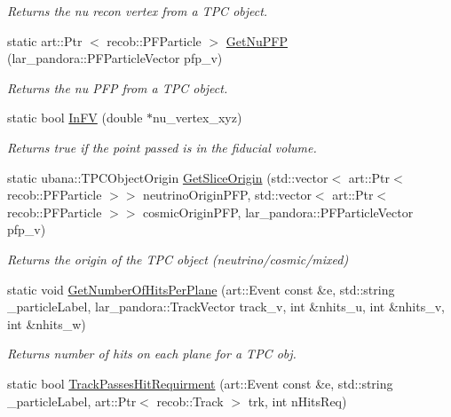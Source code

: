 \begin{DoxyCompactItemize}
\begin{DoxyCompactList}\small\item\em \-Returns the nu recon vertex from a \-T\-P\-C object. \end{DoxyCompactList}\item 
static art\-::\-Ptr\*
$<$ recob\-::\-P\-F\-Particle $>$ \hyperlink{classUBXSecHelper_a1803584104e1b6f618fe86b28aec1927}{\-Get\-Nu\-P\-F\-P} (lar\-\_\-pandora\-::\-P\-F\-Particle\-Vector pfp\-\_\-v)
\begin{DoxyCompactList}\small\item\em \-Returns the nu \-P\-F\-P from a \-T\-P\-C object. \end{DoxyCompactList}\item 
static bool \hyperlink{classUBXSecHelper_a4ff7e0d6774d5628cc2a3d19bb2d3492}{\-In\-F\-V} (double $\ast$nu\-\_\-vertex\-\_\-xyz)
\begin{DoxyCompactList}\small\item\em \-Returns true if the point passed is in the fiducial volume. \end{DoxyCompactList}\item 
static ubana\-::\-T\-P\-C\-Object\-Origin \hyperlink{classUBXSecHelper_a7f4a880c5880a678c7d0f181e92cb748}{\-Get\-Slice\-Origin} (std\-::vector$<$ art\-::\-Ptr$<$ recob\-::\-P\-F\-Particle $>$$>$ neutrino\-Origin\-P\-F\-P, std\-::vector$<$ art\-::\-Ptr$<$ recob\-::\-P\-F\-Particle $>$$>$ cosmic\-Origin\-P\-F\-P, lar\-\_\-pandora\-::\-P\-F\-Particle\-Vector pfp\-\_\-v)
\begin{DoxyCompactList}\small\item\em \-Returns the origin of the \-T\-P\-C object (neutrino/cosmic/mixed) \end{DoxyCompactList}\item 
static void \hyperlink{classUBXSecHelper_a5d811318d7fb66ab5e1816453c017e63}{\-Get\-Number\-Of\-Hits\-Per\-Plane} (art\-::\-Event const \&e, std\-::string \-\_\-particle\-Label, lar\-\_\-pandora\-::\-Track\-Vector track\-\_\-v, int \&nhits\-\_\-u, int \&nhits\-\_\-v, int \&nhits\-\_\-w)
\begin{DoxyCompactList}\small\item\em \-Returns number of hits on each plane for a \-T\-P\-C obj. \end{DoxyCompactList}\item 
static bool \hyperlink{classUBXSecHelper_accf62c400d9e984f1277843de78715a7}{\-Track\-Passes\-Hit\-Requirment} (art\-::\-Event const \&e, std\-::string \-\_\-particle\-Label, art\-::\-Ptr$<$ recob\-::\-Track $>$ trk, int n\-Hits\-Req)

\end{DoxyCompactItemize}

